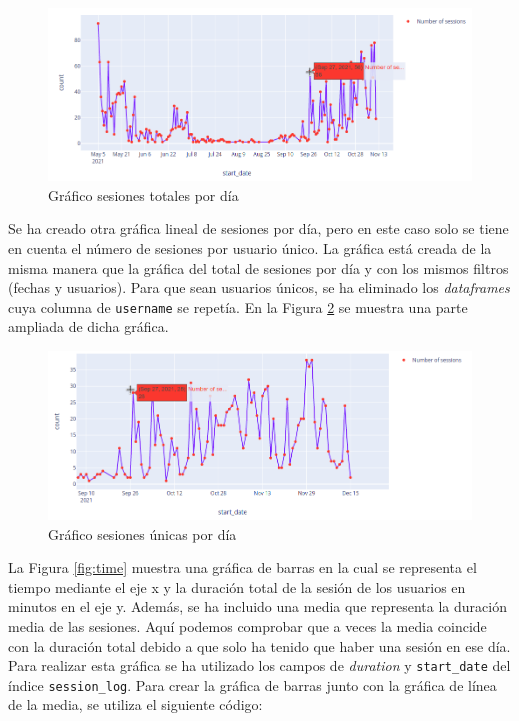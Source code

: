 \begin{figure}[H]
    \centering
    \includegraphics[width=16cm, keepaspectratio]{img/sesion.png}
    \caption{Gráfico sesiones totales por día}
    \label{fig:sesion}
\end{figure}
Se ha creado otra gráfica lineal de sesiones por día, pero en este caso solo se tiene en cuenta el número de sesiones por usuario único. La gráfica está creada de la misma manera que la gráfica del total de sesiones por día y con los mismos filtros (fechas y usuarios). Para que sean usuarios únicos, se ha eliminado los\textit{ dataframes} cuya columna de \texttt{username} se repetía. En la Figura \ref{fig:sesion_users}  se muestra una parte ampliada de dicha gráfica.\\

\begin{figure}[H]
    \centering
    \includegraphics[width=16cm, keepaspectratio]{img/sesion_users.png}
    \caption{Gráfico sesiones únicas por día}
    \label{fig:sesion_users}
\end{figure}
La Figura \ref{fig:time} muestra una gráfica de barras en la cual se representa el tiempo mediante el eje x y la duración total de la sesión de los usuarios en minutos en el eje y. Además, se ha incluido una media que representa la duración media de las sesiones. Aquí podemos comprobar que a veces la media coincide con la duración total debido a que solo ha tenido que haber una sesión en ese día. Para realizar esta gráfica se ha utilizado los campos de \textit{duration} y \texttt{start\_date} del índice \texttt{session\_log}. Para crear la gráfica de barras junto con la gráfica de línea de la media, se utiliza el siguiente código:

